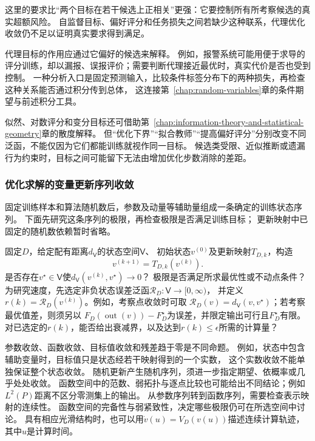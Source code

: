 这里的要求比“两个目标在若干候选上正相关”更强：它要控制所有所考察候选的真实超额风险。
自监督目标、偏好评分和任务损失之间若缺少这种联系，代理优化收敛仍不足以证明真实要求得到满足。

代理目标的作用应通过它偏好的候选来解释。
例如，报警系统可能用便于求导的评分训练，却以漏报、误报评价；需要判断代理接近最优时，真实代价是否也受到控制。
一种分析入口是固定预测输入，比较条件标签分布下的两种损失，再检查这种关系能否通过积分传到总体，
这连接第~\ref{chap:random-variables}章的条件期望与前述积分工具。

似然、对数评分和变分目标还可借助第~\ref{chap:information-theory-and-statistical-geometry}章的散度解释。
但“优化下界”“拟合教师”“提高偏好评分”分别改变不同泛函，不能仅因为它们都能训练就视作同一目标。
候选类受限、近似推断或遗漏行为约束时，目标之间可能留下无法由增加优化步数消除的差距。

\subsubsection{优化求解的变量更新序列收敛}
\label{sec:future-analysis-convergence}

固定训练样本和算法随机数后，参数及动量等辅助量组成一条确定的训练状态序列。
下面先研究这条序列的极限，再检查极限是否满足训练目标；
更新映射中已固定的随机数依赖暂时省略。

\begin{mathproblem}[训练序列的极限与速度]
  \label{question:future-convergence}
  固定$D$，给定配有距离$d_{\mathsf V}$的状态空间$\mathsf V$、
  初始状态$v^{(0)}$及更新映射$T_{D,k}$，构造
  \[
    v^{(k+1)}=T_{D,k}(v^{(k)}).
  \]
  是否存在$v^\star\in\mathsf V$使$d_{\mathsf V}(v^{(k)},v^\star)\to0$？
  极限是否满足所求最优性或不动点条件？
  为研究速度，先选定非负状态误差泛函$\mathcal R_D:\mathsf V\to[0,\infty)$，
  并定义$r(k)=\mathcal R_D(v^{(k)})$。例如，考察点收敛时可取
  $\mathcal R_D(v)=d_{\mathsf V}(v,v^\star)$；若考察最优值差，则须另以
  $F_D(\operatorname{out}(v))-F_D^\star$为误差，并限定输出可行且$F_D^\star$有限。
  对已选定的$r(k)$，能否给出衰减界，以及达到$r(k)\leq\epsilon$所需的计算量？
\end{mathproblem}

参数收敛、函数收敛、目标值收敛和残差趋于零是不同命题。
例如，状态中包含辅助变量时，目标值只是状态经若干映射得到的一个实数，
这个实数收敛不能单独保证整个状态收敛。
随机更新产生随机序列，须进一步指定期望、依概率或几乎处处收敛。
函数空间中的范数、弱拓扑与逐点比较也可能给出不同结论；例如$L^2(P)$距离不区分零测集上的输出。
从参数序列转到函数序列，需要检查表示映射的连续性。
函数空间的完备性与弱紧致性，决定哪些极限仍可在所选空间中讨论。
具有相应光滑结构时，也可以用$\dot v(u)=V_D(v(u))$描述连续计算轨迹，其中$u$是计算时间。

